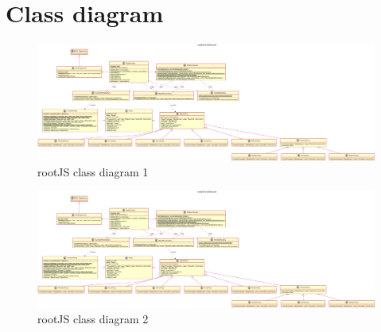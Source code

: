 \section{Class diagram} %

\begin{figure}[H]
	\centering
	\includegraphics[width=5in, trim=0 0 1500 0]{./latex/resources/architecture.pdf}
	\caption{rootJS class diagram 1}
\end{figure}


\begin{figure}[H]
	\centering
	\includegraphics[width=5in, trim=1500 0 0 0]{./latex/resources/architecture.pdf}
	\caption{rootJS class diagram 2}
\end{figure}
